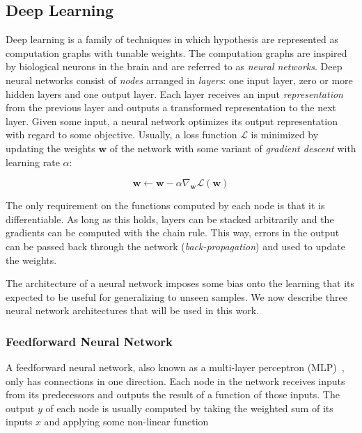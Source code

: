 
\subsection{Deep Learning}

Deep learning is a family of techniques in which hypothesis are represented as computation graphs with tunable weights.
The computation graphs are inspired by biological neurons in the brain and are referred to as \textit{neural networks}.
Deep neural networks consist of \textit{nodes} arranged in \textit{layers}: one input layer, zero or more hidden layers and one output layer.
Each layer receives an input \textit{representation}~\cite{bengio_representation_2014} from the previous layer and outputs a transformed representation to the next layer.
Given some input, a neural network optimizes its output representation with regard to some objective.
Usually, a loss function \(\mathcal{L}\) is minimized by updating the weights \(\mathbf{w}\) of the network with some variant of \textit{gradient descent} with learning rate \(\alpha\):

\begin{equation}
    \mathbf{w} \leftarrow \mathbf{w} - \alpha \nabla_\mathbf{w} \mathcal{L}(\mathbf{w}) 
\end{equation}

The only requirement on the functions computed by each node is that it is differentiable.
As long as this holds, layers can be stacked arbitrarily and the gradients can be computed with the chain rule.
This way, errors in the output can be passed back through the network (\textit{back-propagation}) and used to update the weights.~\cite{russell_artificial_2021,goodfellow_deep_2016}

The architecture of a neural network imposes some bias onto the learning that its expected to be useful for generalizing to unseen samples.
We now describe three neural network architectures that will be used in this work.

\subsubsection{Feedforward Neural Network}

A feedforward neural network, also known as a multi-layer perceptron (MLP)~\cite{goodfellow_deep_2016}, only has connections in one direction.
Each node in the network receives inputs from its predecessors and outputs the result of a function of those inputs.
The output \(y\) of each node is usually computed by taking the weighted sum of its inputs \(x\) and applying some non-linear function

